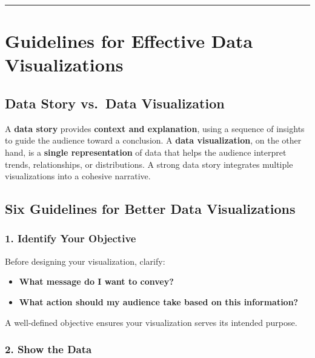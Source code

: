 \documentclass[
  11pt,
]{article}
\providecommand{\tightlist}{%
  \setlength{\itemsep}{0pt}\setlength{\parskip}{0pt}}
\begin{document}
\begin{center}\rule{0.5\linewidth}{0.5pt}\end{center}

\section{Guidelines for Effective Data
Visualizations}\label{guidelines-for-effective-data-visualizations}

\subsection{Data Story vs.~Data
Visualization}\label{data-story-vs.-data-visualization}

A \textbf{data story} provides \textbf{context and explanation}, using a
sequence of insights to guide the audience toward a conclusion. A
\textbf{data visualization}, on the other hand, is a \textbf{single
representation} of data that helps the audience interpret trends,
relationships, or distributions. A strong data story integrates multiple
visualizations into a cohesive narrative.

\subsection{\texorpdfstring{\textbf{Six Guidelines for Better Data
Visualizations}}{Six Guidelines for Better Data Visualizations}}\label{six-guidelines-for-better-data-visualizations}

\subsubsection{\texorpdfstring{\textbf{1. Identify Your
Objective}}{1. Identify Your Objective}}\label{identify-your-objective}

Before designing your visualization, clarify:

\begin{itemize}
\tightlist
\item
  \textbf{What message do I want to convey?}
\item
  \textbf{What action should my audience take based on this
  information?}
\end{itemize}

A well-defined objective ensures your visualization serves its intended
purpose.

\subsubsection{\texorpdfstring{\textbf{2. Show the
Data}}{2. Show the Data}}\label{show-the-data}
\end{document}
